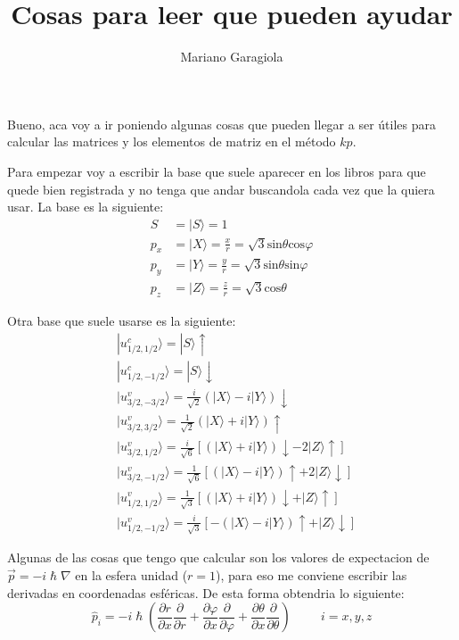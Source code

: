 \documentclass[10pt,a4paper]{article}
\author{Mariano Garagiola}
\title{Cosas para leer que pueden ayudar}
\begin{document}
\maketitle

Bueno, aca voy a ir poniendo algunas cosas que pueden llegar a ser \'utiles para calcular las matrices y 
los elementos de matriz en el m\'etodo $kp$.

Para empezar voy a escribir la base que suele aparecer en los libros para que quede bien registrada y no tenga
 que andar buscandola cada vez que la quiera usar. La base es la siguiente:
\begin{equation}
\label{basebloch1}
\begin{split}
S&=|S\rangle=1\\
p_x&=|X\rangle=\frac{x}{r}=\sqrt{3} \text{sin}\theta \text{cos}\varphi \\
p_y&=|Y\rangle=\frac{y}{r}=\sqrt{3} \text{sin}\theta \text{sin}\varphi \\
p_z&=|Z\rangle=\frac{z}{r}=\sqrt{3} \text{cos}\theta
\end{split}
\end{equation}

Otra base que suele usarse es la siguiente:
\begin{equation}
\label{basebloch2}
\begin{split}
&|u_{1/2,1/2}^c\rangle=|S\rangle \uparrow \\
&|u_{1/2,-1/2}^c\rangle=|S\rangle \downarrow \\
&|u_{3/2,-3/2}^v\rangle=\frac{i}{\sqrt{2}}(|X\rangle-i|Y\rangle)\downarrow \\
&|u_{3/2,3/2}^v\rangle=\frac{1}{\sqrt{2}}(|X\rangle+i|Y\rangle)\uparrow \\
&|u_{3/2,1/2}^v\rangle=\frac{i}{\sqrt{6}}[(|X\rangle+i|Y\rangle)\downarrow-2|Z\rangle\uparrow] \\
&|u_{3/2,-1/2}^v\rangle=\frac{1}{\sqrt{6}}[(|X\rangle-i|Y\rangle)\uparrow+2|Z\rangle\downarrow] \\
&|u_{1/2,1/2}^v\rangle=\frac{1}{\sqrt{3}}[(|X\rangle+i|Y\rangle)\downarrow+|Z\rangle\uparrow ] \\
&|u_{1/2,-1/2}^v\rangle=\frac{i}{\sqrt{3}}[-(|X\rangle-i|Y\rangle)\uparrow+|Z\rangle\downarrow ] 
\end{split}
\end{equation}

Algunas de las cosas que tengo que calcular son los valores de expectacion de $\vec{p}=-i\hslash \nabla$ en la esfera unidad ($r=1$), 
para eso me conviene escribir las derivadas en coordenadas esf\'ericas. De esta forma obtendria lo siguiente:
\begin{equation}
\hat{p}_i = -i \hslash \left( \frac{\partial r}{\partial x}\frac{\partial}{\partial r}+\frac{\partial \varphi}{\partial x}\frac{\partial}{\partial \varphi}
+\frac{\partial \theta}{\partial x}\frac{\partial}{\partial \theta} \right) \hspace{1cm} i=x,y,z
\end{equation}
\end{document}
